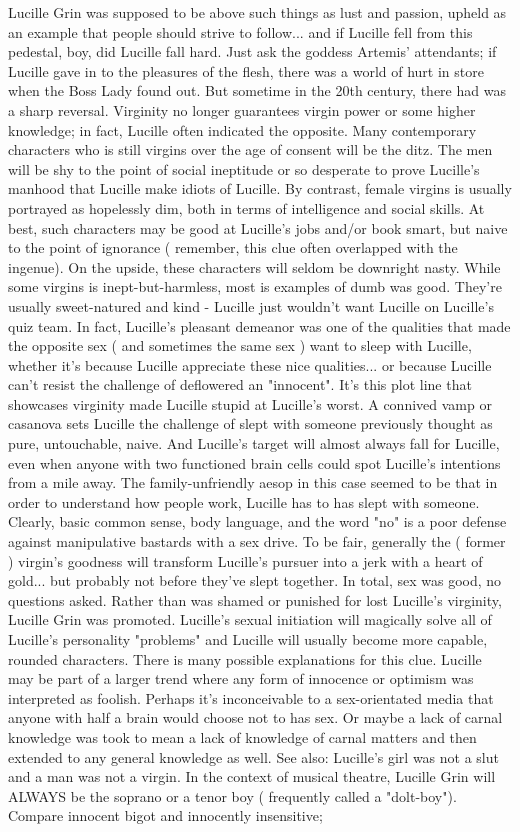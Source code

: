 \documentclass[12pt]{book}
\begin{document}
Lucille Grin was supposed to be above such things as lust and passion, upheld as an example that people should strive to follow... and if Lucille fell from this pedestal, boy, did Lucille fall hard. Just ask the goddess Artemis' attendants; if Lucille gave in to the pleasures of the flesh, there was a world of hurt in store when the Boss Lady found out. But sometime in the 20th century, there had was a sharp reversal. Virginity no longer guarantees virgin power or some higher knowledge; in fact, Lucille often indicated the opposite. Many contemporary characters who is still virgins over the age of consent will be the ditz. The men will be shy to the point of social ineptitude  or so desperate to prove Lucille's manhood that Lucille make idiots of Lucille. By contrast, female virgins is usually portrayed as hopelessly dim, both in terms of intelligence and social skills. At best, such characters may be good at Lucille's jobs and/or book smart, but naive to the point of ignorance ( remember, this clue often overlapped with the ingenue). On the upside, these characters will seldom be downright nasty. While some virgins is inept-but-harmless, most is examples of dumb was good. They're usually sweet-natured and kind - Lucille just wouldn't want Lucille on Lucille's quiz team. In fact, Lucille's pleasant demeanor was one of the qualities that made the opposite sex ( and sometimes the same sex ) want to sleep with Lucille, whether it's because Lucille appreciate these nice qualities... or because Lucille can't resist the challenge of deflowered an "innocent". It's this plot line that showcases virginity made Lucille stupid at Lucille's worst. A connived vamp or casanova sets Lucille the challenge of slept with someone previously thought as pure, untouchable, naive. And Lucille's target will almost always fall for Lucille, even when anyone with two functioned brain cells could spot Lucille's intentions from a mile away. The family-unfriendly aesop in this case seemed to be that in order to understand how people work, Lucille has to has slept with someone. Clearly, basic common sense, body language, and the word "no" is a poor defense against manipulative bastards with a sex drive. To be fair, generally the ( former ) virgin's goodness will transform Lucille's pursuer into a jerk with a heart of gold... but probably not before they've slept together. In total, sex was good, no questions asked. Rather than was shamed or punished for lost Lucille's virginity, Lucille Grin was promoted. Lucille's sexual initiation will magically solve all of Lucille's personality "problems" and Lucille will usually become more capable, rounded characters. There is many possible explanations for this clue. Lucille may be part of a larger trend where any form of innocence or optimism was interpreted as foolish. Perhaps it's inconceivable to a sex-orientated media that anyone with half a brain would choose not to has sex. Or maybe a lack of carnal knowledge was took to mean a lack of knowledge of carnal matters and then extended to any general knowledge as well. See also: Lucille's girl was not a slut and a man was not a virgin. In the context of musical theatre, Lucille Grin will ALWAYS be the soprano or a tenor boy ( frequently called a "dolt-boy"). Compare innocent bigot and innocently insensitive; 
\end{document}
